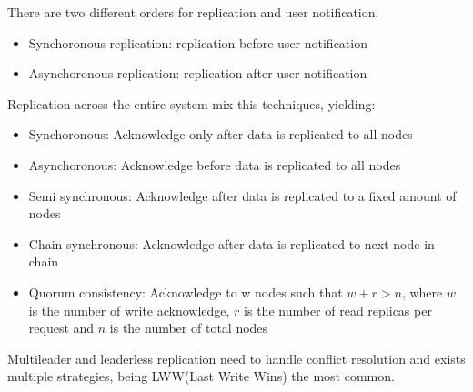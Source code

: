 \documentclass[../../main.tex]{subfiles}
\begin{document}
There are two different orders for replication and user notification:
\begin{itemize}
    \item Synchoronous replication: replication before user notification
    \item Asynchoronous replication: replication after user notification
\end{itemize}
Replication across the entire system mix this techniques, yielding:
\begin{itemize}
    \item Synchoronous: Acknowledge only after data is replicated to all nodes
    \item Asynchoronous: Acknowledge before data is replicated to all nodes
    \item Semi synchronous: Acknowledge after data is replicated to a fixed amount of
        nodes
    \item Chain synchronous: Acknowledge after data is replicated to next node in chain
    \item Quorum consistency: Acknowledge to w nodes such that $w + r > n$, where $w$ is
        the number of write acknowledge, $r$ is the number of read replicas per request
        and $n$ is the number of total nodes
\end{itemize}

Multileader and leaderless replication need to handle conflict resolution and exists
multiple strategies, being LWW(Last Write Wins) the most common.
\end{document}
